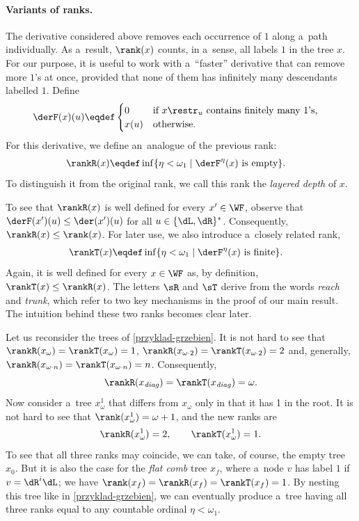 \paragraph{Variants of ranks.}
The derivative considered above removes each occurrence of $1$ along a~path individually.
As a~result, $\rank(x)$ counts, in a~sense, all labels $1$ in the tree $x$.
For our purpose, it is useful to work with a~``faster'' derivative that can remove more $1$'s at once, provided that none of them has infinitely many descendants labelled $1$.
Define
\begin{align*}
	\derF(x)(u) &\eqdef
	\begin{cases}
	  0	& \text{if $x\restr_u$ contains finitely many $1$'s,} \\
	  x(u)	& \text{otherwise.}
	\end{cases}
\end{align*}
For this derivative, we define an~analogue of the previous rank:
\begin{align*}
	\rankR(x)&\eqdef\inf \{\eta<\omega_1\mid \text{$\derF^\eta(x)$ is empty}\}.
\end{align*}
To distinguish it from the original rank, we call this rank the \emph{layered depth} of $x$.

To see that $\rankR(x)$ is well defined for every $x' \in \WF$, observe that $\derF(x')(u) \leq \der(x')(u)$ for all $u\in\{\dL,\dR\}^\ast$. Consequently, $\rankR(x) \leq \rank(x)$.
For later use, we also introduce a~closely related rank,
\begin{align*}
	\rankT(x)&\eqdef\inf \{\eta<\omega_1\mid \text{$\derF^\eta(x)$ is finite}\}.
\end{align*}
Again, it is well defined for every $x \in \WF$ as, by definition, $\rankT(x) \leq \rankR(x)$.
The letters $\sR$ and $\sT$ derive from the words \emph{reach} and \emph{trunk}, which refer to two key mechanisms in the proof of our main result.
The intuition behind these two ranks becomes clear later.

\begin{exa}
	Let us reconsider the trees of \cref{przyklad-grzebien}.
	It is not hard to see that $\rankR(x_\omega) = \rankT(x_\omega) = 1$, $\rankR(x_{\omega\cdot 2})=\rankT(x_{\omega \cdot 2}) = 2$
	and, generally, $\rankR(x_{\omega\cdot n})=\rankT(x_{\omega \cdot n}) = n$.
	Consequently,
	\[
	\rankR(x_{\mathit{diag}}) =\rankT(x_{\mathit{diag}}) = \omega.
	\]
	Now consider a~tree $x^1_\omega$ that differs from $x_\omega$ only in that it has 1 in the root.
	It is not hard to see that $\rank(x^1_\omega)=\omega + 1$, and the new ranks are
	\[
	  \rankR(x^1_\omega)=2, \qquad \rankT(x^1_\omega)=1.
	\]
	To see that all three ranks may coincide, we can take, of course, the empty tree $x_0$.
	But it is also the case for the \emph{flat comb} tree $x_f$, where a~node $v$ has label $1$ if $v=\dR^i\dL$;
	we have $\rank(x_f) = \rankR(x_f) = \rankT(x_f) = 1$.
	By nesting this tree like in \cref{przyklad-grzebien}, we can eventually produce a~tree having all three ranks equal to any countable ordinal $\eta<\omega_1$.
\end{exa}

